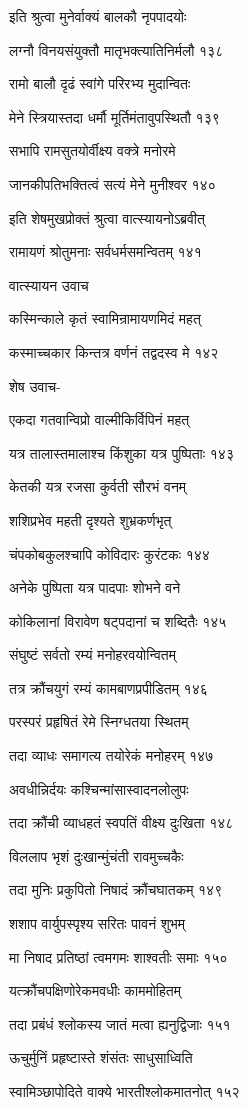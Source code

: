 इति श्रुत्वा मुनेर्वाक्यं बालकौ नृपपादयोः

लग्नौ विनयसंयुक्तौ मातृभक्त्यातिनिर्मलौ १३८

रामो बालौ दृढं स्वांगे परिरभ्य मुदान्वितः

मेने स्त्रियास्तदा धर्मौ मूर्तिमंतावुपस्थितौ १३९

सभापि रामसुतयोर्वीक्ष्य वक्त्रे मनोरमे

जानकीपतिभक्तित्वं सत्यं मेने मुनीश्वर १४०

इति शेषमुखप्रोक्तं श्रुत्वा वात्स्यायनोऽब्रवीत्

रामायणं श्रोतुमनाः सर्वधर्मसमन्वितम् १४१

वात्स्यायन उवाच

कस्मिन्काले कृतं स्वामिन्रामायणमिदं महत्

कस्माच्चकार किन्तत्र वर्णनं तद्वदस्व मे १४२

शेष उवाच-

एकदा गतवान्विप्रो वाल्मीकिर्विपिनं महत्

यत्र तालास्तमालाश्च किंशुका यत्र पुष्पिताः १४३

केतकी यत्र रजसा कुर्वती सौरभं वनम्

शशिप्रभेव महती दृश्यते शुभ्रकर्णभृत्

चंपकोबकुलश्चापि कोविदारः कुरंटकः १४४

अनेके पुष्पिता यत्र पादपाः शोभने वने

कोकिलानां विरावेण षट्पदानां च शब्दितैः १४५

संघुष्टं सर्वतो रम्यं मनोहरवयोन्वितम्

तत्र क्रौंचयुगं रम्यं कामबाणप्रपीडितम् १४६

परस्परं प्रहृषितं रेमे स्निग्धतया स्थितम्

तदा व्याधः समागत्य तयोरेकं मनोहरम् १४७

अवधीन्निर्दयः कश्चिन्मांसास्वादनलोलुपः

तदा क्रौंची व्याधहतं स्वपतिं वीक्ष्य दुःखिता १४८

विललाप भृशं दुःखान्मुंचंती रावमुच्चकैः

तदा मुनिः प्रकुपितो निषादं क्रौंचघातकम् १४९

शशाप वार्युपस्पृश्य सरितः पावनं शुभम्

मा निषाद प्रतिष्ठां त्वमगमः शाश्वतीः समाः १५०

यत्क्रौंचपक्षिणोरेकमवधीः काममोहितम्

तदा प्रबंधं श्लोकस्य जातं मत्वा ह्यनुद्विजाः १५१

ऊचुर्मुनिं प्रहृष्टास्ते शंसंतः साधुसाध्विति

स्वामिञ्छापोदिते वाक्ये भारतीश्लोकमातनोत् १५२

